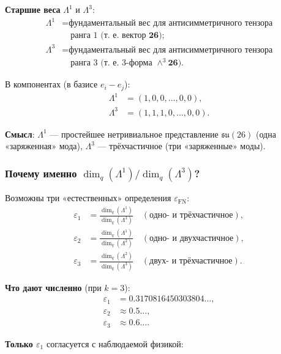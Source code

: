 \documentclass[11pt,a4paper]{article}
\newcommand{\epsFN}{\ensuremath{\varepsilon_{\text{FN}}}}
\theoremstyle{definition}
\begin{document}
\medskip\noindent
\textbf{Старшие веса} $\Lambda^1$ и $\Lambda^3$:
\begin{align}
    \Lambda^1 &= \text{фундаментальный вес для антисимметричного тензора} \\
    &\quad \text{ранга 1 (т.~е. вектор $\mathbf{26}$)}; \\
    \Lambda^3 &= \text{фундаментальный вес для антисимметричного тензора} \\
    &\quad \text{ранга 3 (т.~е. 3-форма $\wedge^3 \mathbf{26}$)}.
\end{align}

В компонентах (в базисе $e_i - e_j$):
\begin{align}
    \Lambda^1 &= (1, 0, 0, \ldots, 0, 0), \\
    \Lambda^3 &= (1, 1, 1, 0, \ldots, 0, 0).
\end{align}

\medskip\noindent
\textbf{Смысл}: $\Lambda^1$ --- простейшее нетривиальное представление
$\mathfrak{su}(26)$ (одна «заряженная» мода), $\Lambda^3$ ---
трёхчастичное (три «заряженные» моды).

\subsubsection{Почему именно \texorpdfstring{$\dim_q(\Lambda^1)/\dim_q(\Lambda^3)$}{\_q(\textasciicircum 1)/\_q(\textasciicircum 3)}?}

Возможны три «естественных» определения $\epsFN$:
\begin{align}
    \varepsilon_1 &= \frac{\dim_q(\Lambda^1)}{\dim_q(\Lambda^3)}
    \quad (\text{одно- и трёхчастичное}), \\
    \varepsilon_2 &= \frac{\dim_q(\Lambda^1)}{\dim_q(\Lambda^2)}
    \quad (\text{одно- и двухчастичное}), \\
    \varepsilon_3 &= \frac{\dim_q(\Lambda^2)}{\dim_q(\Lambda^3)}
    \quad (\text{двух- и трёхчастичное}).
\end{align}

\textbf{Что дают численно} (при $k=3$):
\begin{align}
    \varepsilon_1 &= 0.3170816450303804\ldots, \\
    \varepsilon_2 &\approx 0.5\ldots, \\
    \varepsilon_3 &\approx 0.6\ldots.
\end{align}

\textbf{Только $\varepsilon_1$} согласуется с наблюдаемой физикой:
\end{document}
